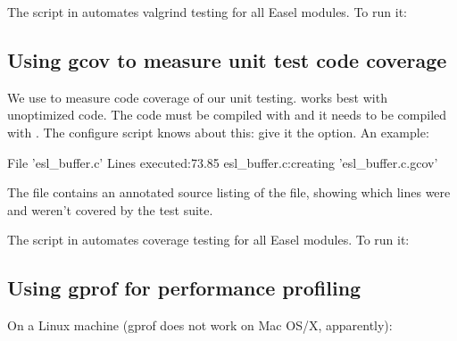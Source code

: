 The  script in  automates
valgrind testing for all Easel modules. To run it:

\begin{cchunk} 
\end{cchunk}




\subsection{Using gcov to measure unit test code coverage}

We use  to measure code coverage of our unit
testing.  works best with unoptimized code.  The code
must be compiled with  and it needs to be compiled with
. The configure script knows
about this: give it the  option. An example:

\begin{cchunk}
  File 'esl_buffer.c'
  Lines executed:73.85%
  esl_buffer.c:creating 'esl_buffer.c.gcov'
\end{cchunk}

The file  contains an annotated source listing
of the  file, showing which lines were and weren't covered
by the test suite.

The  script in  automates coverage
testing for all Easel modules. To run it:

\begin{cchunk} 
\end{cchunk}


\subsection{Using gprof for performance profiling}

On a Linux machine (gprof does not work on Mac OS/X, apparently):

\begin{cchunk}
\end{cchunk}

